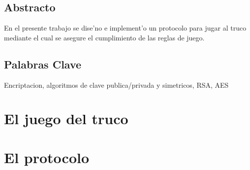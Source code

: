 \documentclass[spanish, a4paper, 11pt]{article}
\begin{document}
\maketitle

\subsection*{Abstracto}
En el presente trabajo se dise'no e implement'o un protocolo para jugar al truco mediante el cual se asegure el cumplimiento de las reglas de juego.


\subsection*{Palabras Clave}
Encriptacion, algoritmos de clave publica/privada y simetricos, RSA, AES


\clearpage
\tableofcontents

\clearpage


\clearpage
\section{El juego del truco}





\clearpage
\section{El protocolo}





\clearpage




\end{document}
